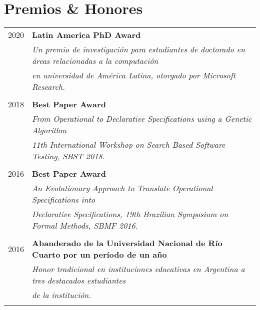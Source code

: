 \documentclass[a4paper,10pt]{article} %
\begin{document}
\section{Premios \& Honores}
\begin{longtable}{rl}

\textsc{2020} & \textbf{Latin America PhD Award} \\
& \textit{Un premio de investigación para estudiantes de doctorado en áreas relacionadas a la computación} \\
& \textit{en universidad de América Latina, otorgado por Microsoft Research.} \\ & \\

\textsc{2018} & \textbf{Best Paper Award} \\ 
& \textit{From Operational to Declarative Specifications using a Genetic Algorithm} \\
& \textit{11th International Workshop on Search-Based Software Testing, SBST 2018.} \\ & \\

\textsc{2016} & \textbf{Best Paper Award} \\ 
& \textit{An Evolutionary Approach to Translate Operational Specifications into } \\
& \textit{Declarative Specifications, 19th Brazilian Symposium on Formal Methods, SBMF 2016.} \\ & \\

\textsc{2016} & \textbf{Abanderado de la Universidad Nacional de Río Cuarto por un período de un año} \\ 
& \textit{Honor tradicional en instituciones educativas en Argentina a tres destacados estudiantes} \\ 
& \textit{de la institución.} \\ & \\
\end{longtable}
\end{document}
